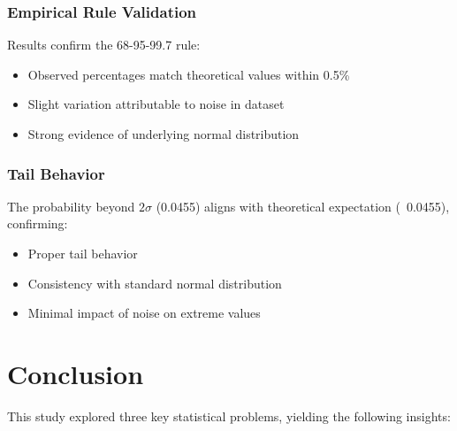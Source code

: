\documentclass[12pt]{article}
\begin{document}
\subsubsection{Empirical Rule Validation}
Results confirm the 68-95-99.7 rule:
\begin{itemize}
    \item Observed percentages match theoretical values within 0.5\%
    \item Slight variation attributable to noise in dataset
    \item Strong evidence of underlying normal distribution
\end{itemize}

\subsubsection{Tail Behavior}
The probability beyond $2\sigma$ (0.0455) aligns with theoretical expectation (~0.0455), confirming:
\begin{itemize}
    \item Proper tail behavior
    \item Consistency with standard normal distribution
    \item Minimal impact of noise on extreme values
\end{itemize}

\section{Conclusion}

This study explored three key statistical problems, yielding the following insights:
\end{document}
